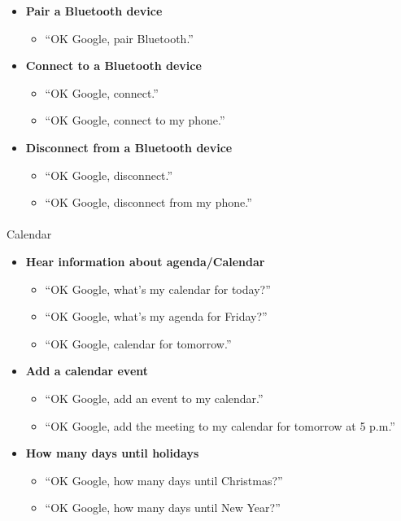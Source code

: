 \documentclass[
  a4paper,
]{article}
\makeatletter
\let\oldparagraph\paragraph
\renewcommand{\paragraph}{
    \@ifstar
      \xxxParagraphStar
      \xxxParagraphNoStar
  }
\newcommand{\xxxParagraphStar}[1]{\oldparagraph*{#1}\mbox{}}
\newcommand{\xxxParagraphNoStar}[1]{\oldparagraph{#1}\mbox{}}
\providecommand{\tightlist}{%
  \setlength{\itemsep}{0pt}\setlength{\parskip}{0pt}}\usepackage{longtable,booktabs,array}
\makeatother
\begin{document}
\begin{itemize}
\tightlist
\item
  \textbf{Pair a Bluetooth device}

  \begin{itemize}
  \tightlist
  \item
    ``OK Google, pair Bluetooth.''
  \end{itemize}
\item
  \textbf{Connect to a Bluetooth device}

  \begin{itemize}
  \tightlist
  \item
    ``OK Google, connect.''
  \item
    ``OK Google, connect to my phone.''
  \end{itemize}
\item
  \textbf{Disconnect from a Bluetooth device}

  \begin{itemize}
  \tightlist
  \item
    ``OK Google, disconnect.''
  \item
    ``OK Google, disconnect from my phone.''
  \end{itemize}
\end{itemize}

\paragraph{Calendar}\label{calendar}

\begin{itemize}
\tightlist
\item
  \textbf{Hear information about agenda/Calendar}

  \begin{itemize}
  \tightlist
  \item
    ``OK Google, what's my calendar for today?''
  \item
    ``OK Google, what's my agenda for Friday?''
  \item
    ``OK Google, calendar for tomorrow.''
  \end{itemize}
\item
  \textbf{Add a calendar event}

  \begin{itemize}
  \tightlist
  \item
    ``OK Google, add an event to my calendar.''
  \item
    ``OK Google, add the meeting to my calendar for tomorrow at 5 p.m.''
  \end{itemize}
\item
  \textbf{How many days until holidays}

  \begin{itemize}
  \tightlist
  \item
    ``OK Google, how many days until Christmas?''
  \item
    ``OK Google, how many days until New Year?''
  \end{itemize}
\end{itemize}
\end{document}
